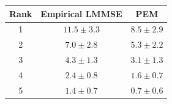 \begin{tabular}{ccc}
\toprule
Rank & Empirical LMMSE & PEM \\
\midrule
1 & $11.5 \pm 3.3$ & $8.5 \pm 2.9$ \\
2 & $7.0 \pm 2.8$ & $5.3 \pm 2.2$ \\
3 & $4.3 \pm 1.3$ & $3.1 \pm 1.3$ \\
4 & $2.4 \pm 0.8$ & $1.6 \pm 0.7$ \\
5 & $1.4 \pm 0.7$ & $0.7 \pm 0.6$ \\
\bottomrule
\end{tabular}
